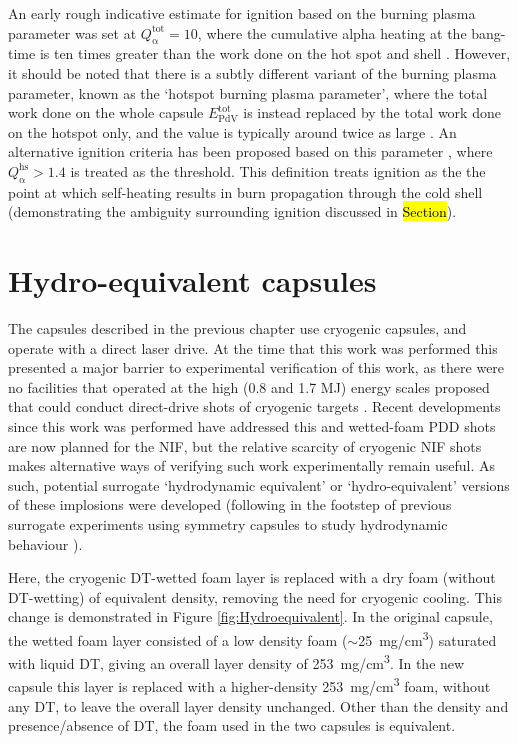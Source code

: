 An early rough indicative estimate for ignition based on the burning plasma parameter was set at $Q^\mathrm{{tot}}_{\mathrm{\alpha}} = 10$, where the cumulative alpha heating at the bang-time is ten times greater than the work done on the hot spot and shell \cite{Betti2011}. However, it should be noted that there is a subtly different variant of the burning plasma parameter, known as the `hotspot burning plasma parameter', where the total work done on the whole capsule $E^\mathrm{{tot}}_{\mathrm{PdV}}$ is instead replaced by the total work done on the hotspot only, and the value is typically around twice as large \cite{Betti2015}. An alternative ignition criteria has been proposed based on this parameter \cite{Christopherson2020}, where $Q^\mathrm{{hs}}_{\mathrm{\alpha}} > 1.4$ is treated as the threshold. This definition treats ignition as the the point at which self-heating results in burn propagation through the cold shell (demonstrating the ambiguity surrounding ignition discussed in \hl{Section}).

\section{Hydro-equivalent capsules}
The capsules described in the previous chapter use cryogenic capsules, and operate with a direct laser drive. At the time that this work was performed this presented a major barrier to experimental verification of this work, as there were no facilities that operated at the high (0.8 and 1.7 MJ) energy scales proposed that could conduct direct-drive shots of cryogenic targets \cite{Hohenberger2015}. Recent developments since this work was performed have addressed this and wetted-foam PDD shots are now planned for the NIF, but the relative scarcity of cryogenic NIF shots makes alternative ways of verifying such work experimentally remain useful. As such, potential surrogate `hydrodynamic equivalent' or `hydro-equivalent' versions of these implosions were developed (following in the footstep of previous surrogate experiments using symmetry capsules to study hydrodynamic behaviour \cite{Weber2016}). 

Here, the cryogenic DT-wetted foam layer is replaced with a dry foam (without DT-wetting) of equivalent density, removing the need for cryogenic cooling. This change is demonstrated in Figure \ref{fig:Hydroequivalent}. In the original capsule, the wetted foam layer consisted of a low density foam ($\sim$25~\si[per-mode=symbol]{\milli\gram\per\centi\meter\cubed}) saturated with liquid DT, giving an overall layer density of 253~\si[per-mode=symbol]{\milli\gram\per\centi\meter\cubed}. In the new capsule this layer is replaced with a higher-density 253~\si[per-mode=symbol]{\milli\gram\per\centi\meter\cubed} foam, without any DT, to leave the overall layer density  unchanged. Other than the density and presence/absence of DT, the foam used in the two capsules is equivalent.

